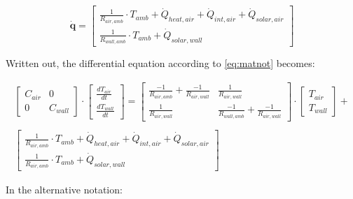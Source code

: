 \begin{equation}
	\mathbf{\dot{q}} =
	\begin{bmatrix}
		\frac{1}{R_{air, amb}} \cdot T_{amb} + \dot{Q}_{heat, air} + \dot{Q}_{int, air} + \dot{Q}_{solar, air} \\
		\frac{1}{R_{wall, amb}} \cdot T_{amb} + \dot{Q}_{solar, wall}
	\end{bmatrix}
\end{equation}

Written out, the differential equation according to \eqref{eq:matnot} becomes:

\begin{equation}
	\begin{aligned}
		\begin{bmatrix}
			C_{air} & 0 \\
			0 &  C_{wall}
		\end{bmatrix}
		\cdot
		\begin{bmatrix}
			\frac{dT_{air}}{dt} \\
			\frac{dT_{wall}}{dt}
		\end{bmatrix}
		=
		\begin{bmatrix}
			\frac{-1}{R_{air, amb}} + \frac{-1}{R_{air, wall}} & \frac{1}{R_{air, wall}} \\
			\frac{1}{R_{air, wall}} &  \frac{-1}{R_{wall, amb}} + \frac{-1}{R_{air, wall}}
		\end{bmatrix}
		\cdot
		\begin{bmatrix}
			T_{air} \\
			T_{wall}
		\end{bmatrix}
		+ \\ \\
		\begin{bmatrix}
			\frac{1}{R_{air, amb}} \cdot T_{amb} + \dot{Q}_{heat, air} + \dot{Q}_{int, air} + \dot{Q}_{solar, air} \\
			\frac{1}{R_{air, amb}} \cdot T_{amb} + \dot{Q}_{solar, wall}
		\end{bmatrix}
	\end{aligned}
\end{equation}

In the alternative notation:

